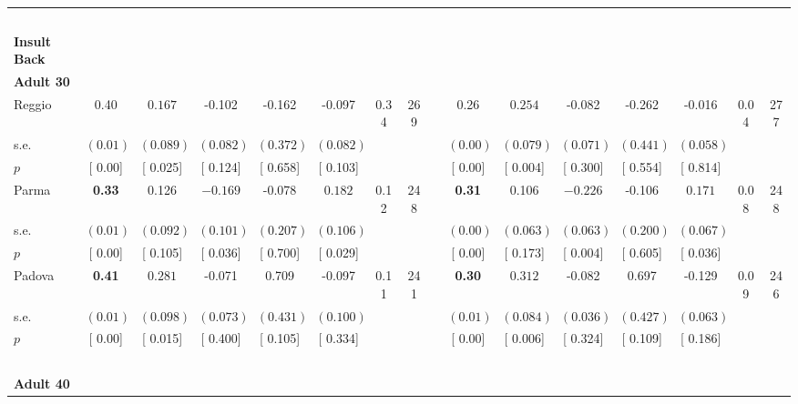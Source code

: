 \begin{longtable}{L{8em} c c c c c c c p{1em} c c c c c c c}
~\\[1em]
\textbf{Insult Back} \\*
\quad \quad \textbf{Adult 30} & & & & & & & & & & & & & & & \\* 
\quad \quad \quad Reggio& 0.40 & $ \mathbf{    0.167}$ &    -0.102 &    -0.162 &    -0.097 &      0.34 &       269 & & 0.26 & $ \mathbf{    0.254}$ &    -0.082 &    -0.262 &    -0.016 &      0.04 &       277  \\*
\quad \quad \quad \quad s.e.& $ (     0.01)$ & $ (    0.089)$ & $ (    0.082)$ & $ (    0.372)$ & $ (    0.082)$ & & & & $ (     0.00)$ & $ (    0.079)$ & $ (    0.071)$ & $ (    0.441)$ & $ (    0.058)$ & &  \\*
\quad \quad \quad \quad $ p$ & [     0.00] & [    0.025] & [    0.124] & [    0.658] & [    0.103] & & & & [     0.00] & [    0.004] & [    0.300] & [    0.554] & [    0.814] & &  \\[1em]
\quad \quad \quad Parma& \textbf{     0.33} &     0.126 & $ \mathbf{   -0.169}$ &    -0.078 & $ \mathbf{    0.182}$ &      0.12 &       248 & & \textbf{     0.31} &     0.106 & $ \mathbf{   -0.226}$ &    -0.106 & $ \mathbf{    0.171}$ &      0.08 &       248  \\*
\quad \quad \quad \quad s.e.& $ (     0.01)$ & $ (    0.092)$ & $ (    0.101)$ & $ (    0.207)$ & $ (    0.106)$ & & & & $ (     0.00)$ & $ (    0.063)$ & $ (    0.063)$ & $ (    0.200)$ & $ (    0.067)$ & &  \\*
\quad \quad \quad \quad $ p$ & [     0.00] & [    0.105] & [    0.036] & [    0.700] & [    0.029] & & & & [     0.00] & [    0.173] & [    0.004] & [    0.605] & [    0.036] & &  \\[1em]
\quad \quad \quad Padova& \textbf{     0.41} & $ \mathbf{    0.281}$ &    -0.071 &     0.709 &    -0.097 &      0.11 &       241 & & \textbf{     0.30} & $ \mathbf{    0.312}$ &    -0.082 &     0.697 &    -0.129 &      0.09 &       246  \\*
\quad \quad \quad \quad s.e.& $ (     0.01)$ & $ (    0.098)$ & $ (    0.073)$ & $ (    0.431)$ & $ (    0.100)$ & & & & $ (     0.01)$ & $ (    0.084)$ & $ (    0.036)$ & $ (    0.427)$ & $ (    0.063)$ & &  \\*
\quad \quad \quad \quad $ p$ & [     0.00] & [    0.015] & [    0.400] & [    0.105] & [    0.334] & & & & [     0.00] & [    0.006] & [    0.324] & [    0.109] & [    0.186] & &  \\[1em]
~\\[1em]
\quad \quad \textbf{Adult 40} & & & & & & & & & & & & & & & \\* 

\end{longtable}

